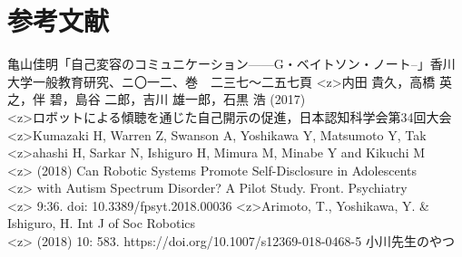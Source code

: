 \documentclass[b5j,twoside,twocolumn]{utarticle}
\begin{document}
\section*{参考文献}%
\begin{thebibliography}{99}
{\small
{}亀山佳明「自己変容のコミュニケーション------G・ベイトソン・ノート--」香川大学一般教育研究、ニ〇一二、巻　二三七〜二五七頁
\pbox<z>{内田 貴久，高橋 英之，伴 碧，島谷 二郎，吉川 雄一郎，石黒 浩 (2017)}\\\pbox<z>{ロボットによる傾聴を通じた自己開示の促進，\footnotesize 日本認知科学会第34回大会}
\pbox<z>{Kumazaki H, Warren Z, Swanson A, Yoshikawa Y, Matsumoto Y, Tak}\\\pbox<z>{ahashi H, Sarkar N, Ishiguro H, Mimura M, Minabe Y and Kikuchi M}\\\pbox<z>{ (2018) Can Robotic Systems Promote Self-Disclosure in Adolescents}\\\pbox<z>{ with Autism Spectrum Disorder? A Pilot Study. Front. Psychiatry}\\\pbox<z>{ 9:36. doi: 10.3389/fpsyt.2018.00036}
\pbox<z>{Arimoto, T., Yoshikawa, Y. \& Ishiguro, H. Int J of Soc Robotics}\\\pbox<z>{ (2018) 10: 583. https://doi.org/10.1007/s12369-018-0468-5}
 小川先生のやつ

}
\end{thebibliography}

\end{document}
